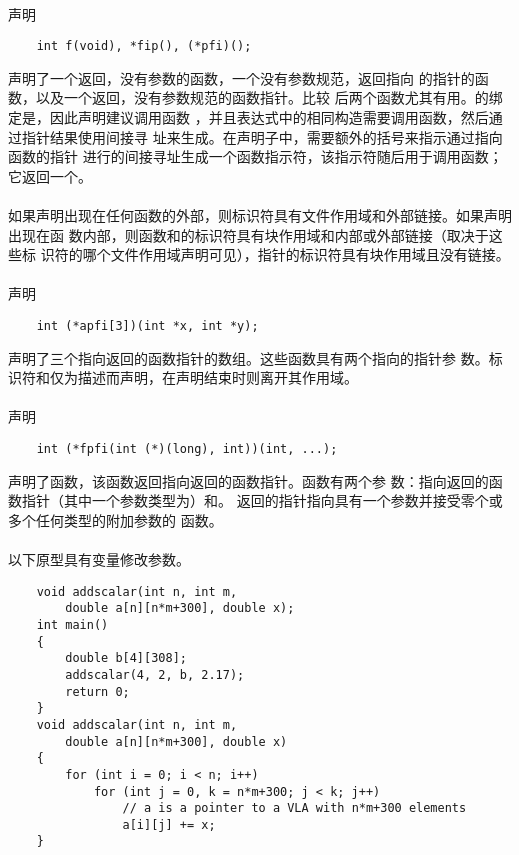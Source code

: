 \paragraph{}
\ex 声明
\begin{lstlisting}
    int f(void), *fip(), (*pfi)();
\end{lstlisting}
声明了一个返回，没有参数的函数，一个没有参数规范，返回指向
的指针的函数，以及一个返回，没有参数规范的函数指针。比较
后两个函数尤其有用。的绑定是，因此声明建议调用函数
，并且表达式中的相同构造需要调用函数，然后通过指针结果使用间接寻
址来生成。在声明子中，需要额外的括号来指示通过指向函数的指针
进行的间接寻址生成一个函数指示符，该指示符随后用于调用函数；它返回一个。

\paragraph{}
如果声明出现在任何函数的外部，则标识符具有文件作用域和外部链接。如果声明出现在函
数内部，则函数和的标识符具有块作用域和内部或外部链接（取决于这些标
识符的哪个文件作用域声明可见），指针的标识符具有块作用域且没有链接。

\paragraph{}
\ex 声明
\begin{lstlisting}
    int (*apfi[3])(int *x, int *y);
\end{lstlisting}
声明了三个指向返回的函数指针的数组。这些函数具有两个指向的指针参
数。标识符和仅为描述而声明，在声明结束时则离开其作用域。

\paragraph{}
\ex 声明
\begin{lstlisting}
    int (*fpfi(int (*)(long), int))(int, ...);
\end{lstlisting}
声明了函数，该函数返回指向返回的函数指针。函数有两个参
数：指向返回的函数指针（其中一个参数类型为）和。
返回的指针指向具有一个参数并接受零个或多个任何类型的附加参数的
函数。

\paragraph{}
\ex 以下原型具有变量修改参数。
\begin{lstlisting}
    void addscalar(int n, int m,
        double a[n][n*m+300], double x);
    int main()
    {
        double b[4][308];
        addscalar(4, 2, b, 2.17);
        return 0;
    }
    void addscalar(int n, int m,
        double a[n][n*m+300], double x)
    {
        for (int i = 0; i < n; i++)
            for (int j = 0, k = n*m+300; j < k; j++)
                // a is a pointer to a VLA with n*m+300 elements
                a[i][j] += x;
    }
\end{lstlisting}

